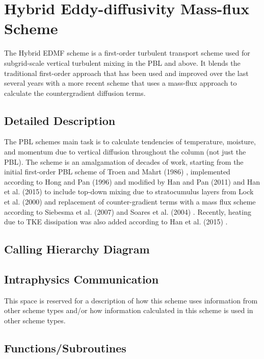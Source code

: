 \hypertarget{group___p_b_l}{}\section{Hybrid Eddy-\/diffusivity Mass-\/flux Scheme}
\label{group___p_b_l}


The Hybrid E\+D\+MF scheme is a first-\/order turbulent transport scheme used for subgrid-\/scale vertical turbulent mixing in the P\+BL and above. It blends the traditional first-\/order approach that has been used and improved over the last several years with a more recent scheme that uses a mass-\/flux approach to calculate the countergradient diffusion terms.  




\subsection{Detailed Description}
The P\+BL scheme\textquotesingle{}s main task is to calculate tendencies of temperature, moisture, and momentum due to vertical diffusion throughout the column (not just the P\+BL). The scheme is an amalgamation of decades of work, starting from the initial first-\/order P\+BL scheme of Troen and Mahrt (1986) \cite{troen_and_mahrt_1986}, implemented according to Hong and Pan (1996) \cite{hong_and_pan_1996} and modified by Han and Pan (2011) \cite{han_and_pan_2011} and Han et al. (2015) \cite{han_et_al_2015} to include top-\/down mixing due to stratocumulus layers from Lock et al. (2000) \cite{lock_et_al_2000} and replacement of counter-\/gradient terms with a mass flux scheme according to Siebesma et al. (2007) \cite{siebesma_et_al_2007} and Soares et al. (2004) \cite{soares_et_al_2004}. Recently, heating due to T\+KE dissipation was also added according to Han et al. (2015) \cite{han_et_al_2015}.\hypertarget{group___g_f_s___n_s_s_t_diagram}{}\subsection{Calling Hierarchy Diagram}\label{group___g_f_s___n_s_s_t_diagram}
 \hypertarget{group___g_f_s___n_s_s_t_intraphysics}{}\subsection{Intraphysics Communication}\label{group___g_f_s___n_s_s_t_intraphysics}
This space is reserved for a description of how this scheme uses information from other scheme types and/or how information calculated in this scheme is used in other scheme types. \subsection*{Functions/\+Subroutines}
